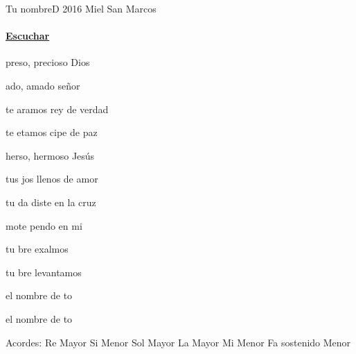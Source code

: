 \documentclass[12pt, spanish]{book}
\begin{document}
    \begin{song}{Tu nombre}{D}
        {2016} %
        {Miel San Marcos}
        {} %
        {}
        \ifChordBk
        \paragraph{\mbox{}\hfill\protect\href{https://open.spotify.com/intl-es/track/2JZ9xtZrEvZ76cbiKwySUf}{Escuchar}\mbox{}\hfill}
        \fi



        \begin{SBOpGroup}
            preso, precioso Dios

            ado, amado señor

            te aramos rey de verdad

            te etamos  cipe de paz

            herso, hermoso Jesús

            tus jos llenos de amor

            tu da diste en la cruz

            mote pendo en mi
        \end{SBOpGroup}


        \begin{SBChorus}
            tu bre exalmos

            tu bre levantamos

            el nombre de to

            el nombre de to
        \end{SBChorus}

        \ifChordBk
        \begin{SBOpGroup}
            Acordes:\break
            \upchord{\D}\qquad Re Mayor \hfill
            \upchord{\Bm}\qquad Si Menor \hfill\null\break
            \upchord{\G}\qquad Sol Mayor \hfill
            \upchord{\A}\qquad La Mayor \hfill\null\break
            \upchord{\Em}\qquad Mi Menor \hfill
            \upchord{\Fsm}Fa sostenido Menor \hfill\null\break
        \end{SBOpGroup}
        \fi
    \end{song}
\end{document}
